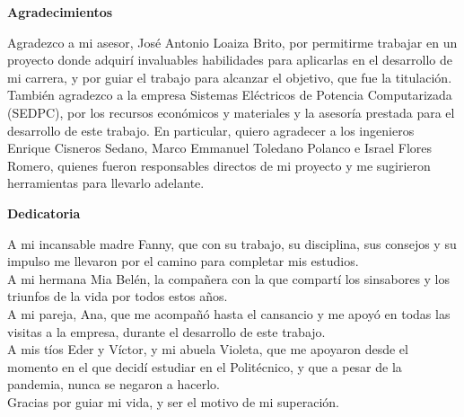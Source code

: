 \thispagestyle{empty}
\textbf{\Huge Agradecimientos}
\vspace{1cm}

Agradezco a mi asesor, José Antonio Loaiza Brito, por permitirme trabajar en un proyecto donde adquirí invaluables habilidades para aplicarlas en el desarrollo de mi carrera, y por guiar el trabajo para alcanzar el objetivo, que fue la titulación.\\
También agradezco a la empresa Sistemas Eléctricos de Potencia Computarizada (SEDPC), por los recursos económicos y materiales y la asesoría prestada para el desarrollo de este trabajo. En particular, quiero agradecer a los ingenieros Enrique Cisneros Sedano, Marco Emmanuel Toledano Polanco e Israel Flores Romero, quienes fueron responsables directos de mi proyecto y me sugirieron herramientas para llevarlo adelante.

\newpage
\thispagestyle{empty}
\textbf{\Huge Dedicatoria}
\vspace{1cm}

A mi incansable madre Fanny, que con su trabajo, su disciplina, sus consejos y su impulso me llevaron por el camino para completar mis estudios.\\
A mi hermana Mia Belén, la compañera con la que compartí los sinsabores y los triunfos de la vida por todos estos años.\\
A mi pareja, Ana, que me acompañó hasta el cansancio y me apoyó en todas las visitas a la empresa, durante el desarrollo de este trabajo.\\
A mis tíos Eder y Víctor, y mi abuela Violeta, que me apoyaron desde el momento en el que decidí estudiar en el Politécnico, y que a pesar de la pandemia, nunca se negaron a hacerlo.\\
Gracias por guiar mi vida, y ser el motivo de mi superación.